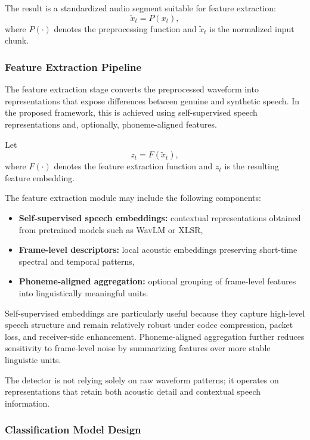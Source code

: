 The result is a standardized audio segment suitable for feature extraction:
\begin{equation}
\tilde{x}_t = P(x_t),
\end{equation}
where \(P(\cdot)\) denotes the preprocessing function and \(\tilde{x}_t\) is the normalized input chunk.

\subsubsection{Feature Extraction Pipeline}

The feature extraction stage converts the preprocessed waveform into representations that expose differences between genuine and synthetic speech. In the proposed framework, this is achieved using self-supervised speech representations and, optionally, phoneme-aligned features.

Let
\begin{equation}
z_t = F(\tilde{x}_t),
\end{equation}
where \(F(\cdot)\) denotes the feature extraction function and \(z_t\) is the resulting feature embedding.

The feature extraction module may include the following components:
\begin{itemize}
    \item \textbf{Self-supervised speech embeddings:} contextual representations obtained from pretrained models such as WavLM or XLSR,
    \item \textbf{Frame-level descriptors:} local acoustic embeddings preserving short-time spectral and temporal patterns,
    \item \textbf{Phoneme-aligned aggregation:} optional grouping of frame-level features into linguistically meaningful units.
\end{itemize}

Self-supervised embeddings are particularly useful because they capture high-level speech structure and remain relatively robust under codec compression, packet loss, and receiver-side enhancement. Phoneme-aligned aggregation further reduces sensitivity to frame-level noise by summarizing features over more stable linguistic units.

The detector is not relying solely on raw waveform patterns; it operates on representations that retain both acoustic detail and contextual speech information.

\subsubsection{Classification Model Design}

